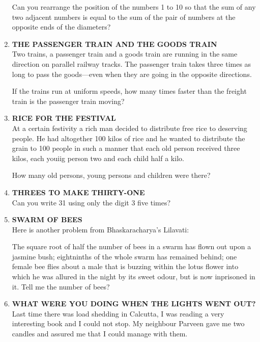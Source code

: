 \documentclass[12pt]{article}
\begin{document}
\begin{enumerate}
Can you rearrange  the position  of the  numbers  1 to 10 so that  the sum  of any two  adjacent  numbers  is equal to the sum  of the pair of numbers  at the opposite  ends  of the diameters? 


\item \textbf{THE  PASSENGER  TRAIN AND  THE  GOODS  TRAIN} \\
Two trains,  a passenger  train  and  a goods  train  are running  in the same  direction  on parallel  railway  tracks. The passenger  train  takes  three  times  as long  to pass  the goods—even  when  they  are  going  in the  opposite directions. 

If the trains  run at uniform  speeds,  how  many  times faster  than  the  freight  train  is the  passenger  train moving? 


\item \textbf{RICE  FOR  THE  FESTIVAL} \\ 
At a certain  festivity  a rich  man  decided  to distribute free rice to deserving  people.  He  had  altogether  100 kilos  of rice  and  he wanted  to distribute  the  grain  to 100 people  in such  a manner  that  each  old person  received three  kilos,  each  youiig  person  two  and each  child  half  a kilo.  

How  many  old persons,  young  persons  and children were  there? 
%
\item \textbf{THREES  TO MAKE  THIRTY-ONE} \\
Can you write  31 using  only  the digit  3 five times? 
%
\item \textbf{SWARM  OF BEES} \\
Here  is another  problem  from  Bhaskaracharya's  Lilavati: 

The square  root  of half  the  number  of bees  in a swarm  has flown  out upon  a jasmine  bush;  eightninths  of the whole  swarm  has remained  behind;  one  female  bee flies about  a male  that  is buzzing  within  the  lotus  flower into which  he was allured  in the night  by its sweet  odour, but is now  inprisoned  in it. Tell  me  the  number  of bees? 


\item \textbf{WHAT  WERE  YOU  DOING WHEN  THE  LIGHTS  WENT  OUT?} \\
Last time  there  was  load  shedding  in Calcutta,  I was reading  a very  interesting  book  and I could  not stop.  My neighbour  Parveen  gave  me two candles  and  assured  me that I could  manage  with  them. 


\end{enumerate}
\end{document}
